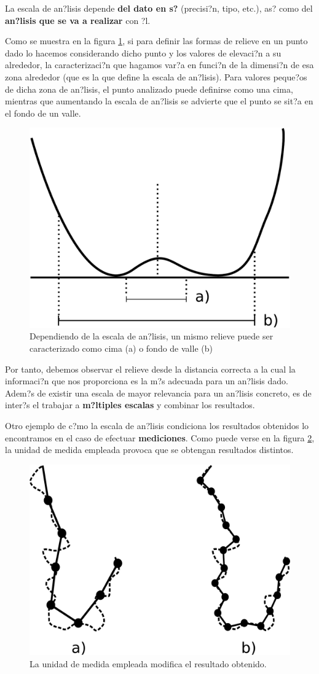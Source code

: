 La escala de an?lisis depende \textbf{del dato en s?} (precisi?n, tipo, etc.), as? como del \textbf{an?lisis que se va a realizar} con ?l.

Como se muestra en la figura \ref{Fig:Escalas_formas_terreno}, si para definir las formas de relieve en un punto dado lo hacemos considerando dicho punto y los valores de elevaci?n a su alrededor, la caracterizaci?n que hagamos var?a en funci?n de la dimensi?n de esa zona alrededor (que es la que define la escala de an?lisis). Para valores peque?os de dicha zona de an?lisis, el punto analizado puede definirse como una cima, mientras que aumentando la escala de an?lisis se advierte que el punto se sit?a en el fondo de un valle.

\begin{figure}[h]   
\centering
\includegraphics[width= .45\columnwidth]{../es/Analisis/Escalas_formas_terreno.pdf}
\caption{\small Dependiendo de la escala de an?lisis, un mismo relieve puede ser caracterizado como cima (a) o fondo de valle (b)}
\label{Fig:Escalas_formas_terreno} 
\end{figure}

Por tanto, debemos observar el relieve desde la distancia correcta a la cual la informaci?n que nos proporciona es la m?s adecuada para un an?lisis dado. Adem?s de existir una escala de mayor relevancia para un an?lisis concreto,  es de inter?s el trabajar a \textbf{m?ltiples escalas} y combinar los resultados.

Otro ejemplo de c?mo la escala de an?lisis condiciona los resultados obtenidos lo encontramos en el caso de efectuar \textbf{mediciones}. Como puede verse en la figura \ref{Fig:Medida_linea_fractal}, la unidad de medida empleada provoca que se obtengan resultados distintos. 

\begin{figure}[h]   
\centering
\includegraphics[width= .45\columnwidth]{../es/Analisis/Medida_linea_fractal.pdf}
\caption{\small La unidad de medida empleada modifica el resultado obtenido.}
\label{Fig:Medida_linea_fractal} 
\end{figure}

